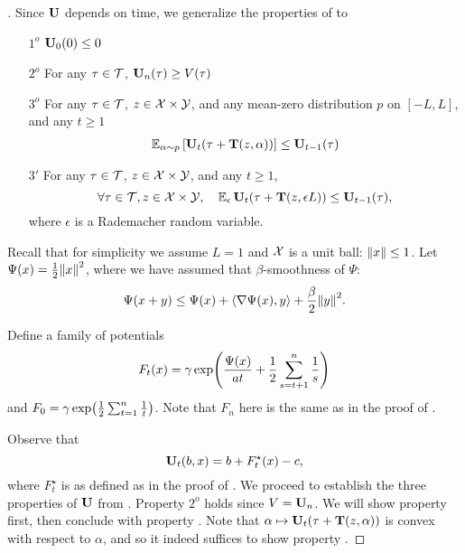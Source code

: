 \begin{proof}[]
    Since $\burk$ depends on time, we generalize the properties of  to
  \begin{enumerate}
  \item[$1^o$] $\burk_{0}(0) \le 0$
  \item[$2^o$] For any $\tau \in \T$, $\burk_{n}(\tau) \ge V(\tau)$
  \item[$3^o$] For any $\tau \in \T$, $z \in \X \times \Y$, and any mean-zero distribution $p$ on $[-L,L]$, and any $t\geq{}1$
    \begin{align}
      \En_{\alpha\sim p}\left[\burk_{t}(\tau + \suff(z,\alpha))\right] \le \burk_{t-1}(\tau) 
    \end{align}    
  \item[$3'$] For any $\tau \in \T$, $z \in \X \times \Y$, and any $t\geq{}1$,
    $$
    \forall \tau \in \T, z \in \X \times \Y,~~~ \En_\epsilon \burk_{t}(\tau + \suff(z,\epsilon L))  \le \burk_{t-1}(\tau),
    $$
    where $\epsilon$ is a Rademacher random variable. 
  \end{enumerate}

  Recall that for simplicity we assume $L=1$ and $\X$ is a unit ball: $\nrm*{x}\leq{}1$. Let $\Psi(x) = \frac{1}{2}\nrm*{x}^{2}$, where we have assumed that $\beta$-smoothness of $\Psi$:
  \[
    \Psi(x+y) \leq{} \Psi(x) + \tri*{\grad{}\Psi(x), y} + \frac{\beta}{2}\nrm*{y}^{2}.
  \]
  
  Define a family of potentials
  \[
    F_{t}(x) = \gamma\exp\prn*{\frac{\Psi(x)}{at} + \frac{1}{2}\sum_{s=t+1}^{n}\frac{1}{s}}
  \]
  and $F_{0} = \gamma\exp\prn*{\frac{1}{2}\sum_{t=1}^{n}\frac{1}{t}}$. Note that $F_{n}$ here is the same as in the proof of .
  
  Observe that
  \[
    \burk_{t}(b, x) = b + F^{\star}_t(x) - c, 
  \]
  where $F_{t}^{\star}$ is as defined as in the proof of . We proceed to establish the three properties of $\burk$ from . Property $2^o$ holds since $V=\burk_{n}$. We will show property \propthreep{} first, then conclude with property \propone{}. Note that $\alpha\mapsto{}\burk_{t}(\tau + \suff(z,\alpha))$ is convex with respect to $\alpha$, and so it indeed suffices to show property \propthreep{}.


\end{proof}
